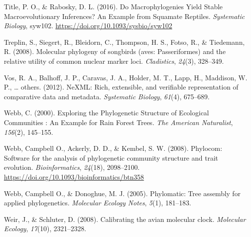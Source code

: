\documentclass[
  english,
  man]{apa6}
\newlength{\cslhangindent}
\newlength{\cslentryspacingunit} %
\newenvironment{CSLReferences}[2] %
 {%
  \setlength{\parindent}{0pt}
  \ifodd #1
  \let\oldpar\par
  \def\par{\hangindent=\cslhangindent\oldpar}
  \fi
  \setlength{\parskip}{#2\cslentryspacingunit}
 }%
 {}
\begin{document}
\begin{CSLReferences}{1}{0}
\leavevmode{}%
Title, P. O., \& Rabosky, D. L. (2016). {Do Macrophylogenies Yield Stable Macroevolutionary Inferences? An Example from Squamate Reptiles}. \emph{Systematic Biology}, syw102. \url{https://doi.org/10.1093/sysbio/syw102}

\leavevmode{}%
Treplin, S., Siegert, R., Bleidorn, C., Thompson, H. S., Fotso, R., \& Tiedemann, R. (2008). Molecular phylogeny of songbirds (aves: Passeriformes) and the relative utility of common nuclear marker loci. \emph{Cladistics}, \emph{24}(3), 328--349.

\leavevmode{}%
Vos, R. A., Balhoff, J. P., Caravas, J. A., Holder, M. T., Lapp, H., Maddison, W. P., \ldots{} others. (2012). NeXML: Rich, extensible, and verifiable representation of comparative data and metadata. \emph{Systematic Biology}, \emph{61}(4), 675--689.

\leavevmode{}%
Webb, C. (2000). {Exploring the Phylogenetic Structure of Ecological Communities : An Example for Rain Forest Trees}. \emph{{The American Naturalist}}, \emph{156}(2), 145--155.

\leavevmode{}%
Webb, Campbell O., Ackerly, D. D., \& Kembel, S. W. (2008). {Phylocom: Software for the analysis of phylogenetic community structure and trait evolution}. \emph{Bioinformatics}, \emph{24}(18), 2098--2100. \url{https://doi.org/10.1093/bioinformatics/btn358}

\leavevmode{}%
Webb, Campbell O., \& Donoghue, M. J. (2005). Phylomatic: Tree assembly for applied phylogenetics. \emph{{Molecular Ecology Notes}}, \emph{5}(1), 181--183.

\leavevmode{}%
Weir, J., \& Schluter, D. (2008). Calibrating the avian molecular clock. \emph{Molecular Ecology}, \emph{17}(10), 2321--2328.

\end{CSLReferences}

\endgroup
\end{document}
